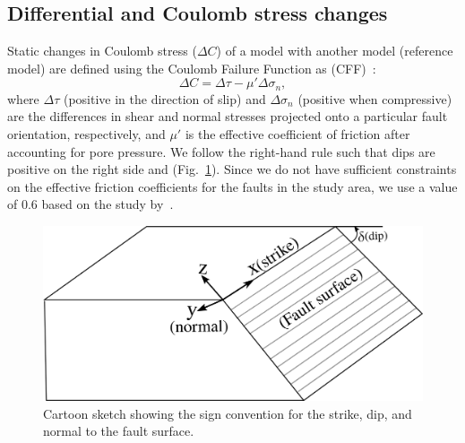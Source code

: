 \documentclass[draft,linenumbers]{agujournal2018}
\begin{document}
\subsection{Differential and Coulomb stress changes}
Static changes in Coulomb stress ($\Delta C$) of a model with another model (reference model) are defined using the Coulomb Failure Function as (CFF)~\citep{king1994static}:
%
\begin{equation}
    \Delta C = \Delta \tau - \mu' \Delta \sigma_n,
\end{equation}
%
where $\Delta \tau$ (positive in the direction of slip) and $\Delta\sigma_n$ (positive when compressive) are the differences in shear and normal stresses projected onto a particular fault orientation, respectively, and $\mu'$ is the effective coefficient of friction after accounting for pore pressure. We follow the right-hand rule such that dips are positive on the right side  and  (Fig.~\ref{signs}).
Since we do not have sufficient constraints on the effective friction coefficients for the faults in the study area, we use a value of 0.6 based on the study by~\citet{hurd2012intraplate}. 
%
\begin{figure}[h!]
    \centering
    \includegraphics[width=0.5\linewidth]{figures/sign_convention.png}
    \caption{Cartoon sketch showing the sign convention for the strike, dip, and normal to the fault surface.}
    \label{signs}
\end{figure}
\end{document}
